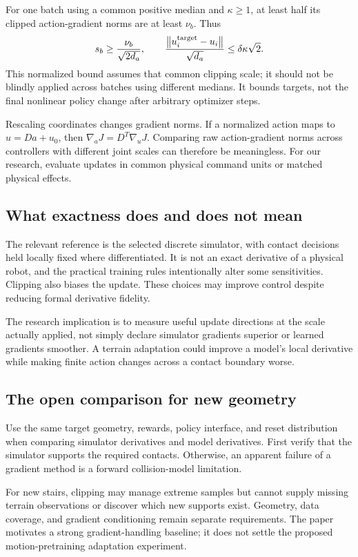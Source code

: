 For one batch using a common positive median and $\kappa\ge1$, at least half its
clipped action-gradient norms are at least $\nu_b$. Thus
\begin{equation}
s_b\ge\frac{\nu_b}{\sqrt{2d_a}},\qquad
\frac{\left\lVert u_i^{\rm target}-u_i\right\rVert}{\sqrt{d_a}}
\le\delta\kappa\sqrt2.
\end{equation}
This normalized bound assumes that common clipping scale; it should not be
blindly applied across batches using different medians. It bounds targets, not
the final nonlinear policy change after arbitrary optimizer steps.

Rescaling coordinates changes gradient norms. If a normalized action maps to
$u=Da+u_0$, then $\nabla_aJ=D^T\nabla_uJ$. Comparing raw action-gradient norms
across controllers with different joint scales can therefore be meaningless.
For our research, evaluate updates in common physical command units or matched
physical effects.

\subsection{What exactness does and does not mean}
The relevant reference is the selected discrete simulator, with contact decisions
held locally fixed where differentiated. It is not an exact derivative of a
physical robot, and the practical training rules intentionally alter some
sensitivities. Clipping also biases the update. These choices may improve
control despite reducing formal derivative fidelity.

The research implication is to measure useful update directions at the scale
actually applied, not simply declare simulator gradients superior or learned
gradients smoother. A terrain adaptation could improve a model's local derivative
while making finite action changes across a contact boundary worse.

\subsection{The open comparison for new geometry}
Use the same target geometry, rewards, policy interface, and reset distribution
when comparing simulator derivatives and model derivatives. First verify that
the simulator supports the required contacts. Otherwise, an apparent failure of
a gradient method is a forward collision-model limitation.

For new stairs, clipping may manage extreme samples but cannot supply missing
terrain observations or discover which new supports exist. Geometry, data
coverage, and gradient conditioning remain separate requirements. The paper
motivates a strong gradient-handling baseline; it does not settle the proposed
motion-pretraining adaptation experiment.


